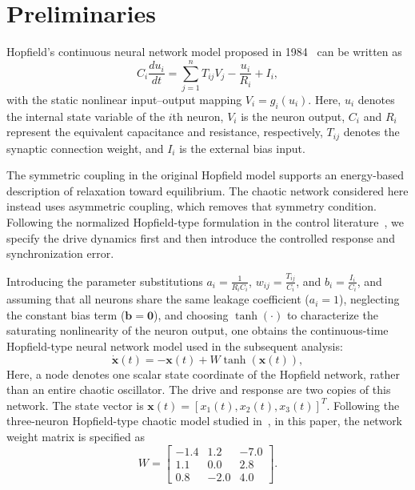 \documentclass[a4paper,fleqn]{cas-dc}
\theoremstyle{plain}
\theoremstyle{definition}
\begin{document}
\section{Preliminaries}
\label{sec:preliminaries}
Hopfield's continuous neural network model proposed in 1984~\cite{hopfield1984neurons} can be written as
\begin{equation}
	C_i \frac{du_i}{dt} = \sum_{j=1}^{n} T_{ij} V_j - \frac{u_i}{R_i} + I_i,
	\label{eq:hopfield_original_1}
\end{equation}
with the static nonlinear input--output mapping $V_i = g_i(u_i)$. Here, $u_i$ denotes the internal state variable of the $i$th neuron, $V_i$ is the neuron output, $C_i$ and $R_i$ represent the equivalent capacitance and resistance, respectively, $T_{ij}$ denotes the synaptic connection weight, and $I_i$ is the external bias input.

The symmetric coupling in the original Hopfield model supports an energy-based description of relaxation toward equilibrium. The chaotic network considered here instead uses asymmetric coupling, which removes that symmetry condition. Following the normalized Hopfield-type formulation in the control literature~\cite{LI2013a, mahmoud2021analysis}, we specify the drive dynamics first and then introduce the controlled response and synchronization error.

Introducing the parameter substitutions $a_i = \frac{1}{R_i C_i}$, $w_{ij} = \frac{T_{ij}}{C_i}$, and $b_i = \frac{I_i}{C_i}$, and assuming that all neurons share the same leakage coefficient ($a_i=1$), neglecting the constant bias term ($\mathbf{b}=\mathbf{0}$), and choosing $\tanh(\cdot)$ to characterize the saturating nonlinearity of the neuron output, one obtains the continuous-time Hopfield-type neural network model used in the subsequent analysis:
\begin{equation}
	\dot{\mathbf{x}}(t) = -\mathbf{x}(t) + W \tanh(\mathbf{x}(t)),
	\label{eq:hopfield_simplified_vector}
\end{equation}
Here, a node denotes one scalar state coordinate of the Hopfield network, rather than an entire chaotic oscillator. The drive and response are two copies of this network. The state vector is $\mathbf{x}(t) = [x_1(t), x_2(t), x_3(t)]^T$. Following the three-neuron Hopfield-type chaotic model studied in~\cite{mahmoud2021analysis}, in this paper, the network weight matrix is specified as
\begin{equation}
	W = \begin{bmatrix}
		-1.4 & 1.2 & -7.0 \\
		1.1 & 0.0 & 2.8 \\
		0.8 & -2.0 & 4.0
	\end{bmatrix}.
	\label{eq:weight_matrix}
\end{equation}
\end{document}
